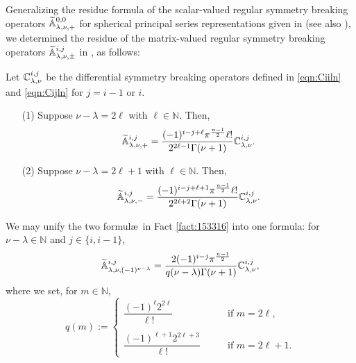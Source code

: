 Generalizing the residue formula
 of the scalar-valued regular symmetry breaking operators
 ${\widetilde{\mathbb{A}}}_{{\lambda},{\nu},{+}}^{{0,0}}$
 for spherical principal series representations
 given in \cite{xkEastwood} (see also \cite[Thm.~12.2]{sbon}), 
 we determined the residue
 of the matrix-valued regular symmetry breaking operators
 ${\widetilde{\mathbb{A}}}_{{\lambda},{\nu},{\pm}}^{{i,j}}$
 in \cite{xkresidue}, 
 as follows:
\begin{fact}
\label{fact:153316}
Let ${\mathbb{C}}_{{\lambda},{\nu}}^{{i,j}}$ be the differential symmetry breaking operators
 defined in \eqref{eqn:Ciiln}
 and \eqref{eqn:Cijln} for $j=i-1$ or $i$.  
\begin{enumerate}
\item[{\rm{(1)}}]
Suppose $\nu-\lambda=2\ell$ with $\ell \in {\mathbb{N}}$.  
Then, 
\begin{equation}
\label{eqn:Aijres1}
{\widetilde{\mathbb{A}}}_{{\lambda},{\nu},{+}}^{{i,j}} 
=
\frac{(-1)^{i-j+\ell} \pi^{\frac{n-1}{2}} \ell !}{2^{2\ell-1}\Gamma(\nu+1)}
{\mathbb{C}}_{{\lambda},{\nu}}^{{i,j}}.  
\end{equation}
\item[{\rm{(2)}}]
Suppose $\nu-\lambda=2\ell+1$ with $\ell \in {\mathbb{N}}$.  
Then, 
\[
{\widetilde{\mathbb{A}}}_{{\lambda},{\nu},{-}}^{{i,j}} 
=
\frac{(-1)^{i-j+\ell+1} \pi^{\frac{n-1}{2}} \ell !}{2^{2\ell+2}\Gamma(\nu+1)}
{\mathbb{C}}_{{\lambda},{\nu}}^{{i,j}}.  
\]
\end{enumerate}
\end{fact}



We may unify the two formul\ae\
 in Fact \ref{fact:153316}
 into one formula:
for $\nu -\lambda \in {\mathbb{N}}$ and $j \in \{i,i-1\}$, 
\begin{equation}
\label{eqn:qAC}
{\widetilde{\mathbb{A}}}_{{\lambda},{\nu},{(-1)^{\nu-\lambda}}}^{{i,j}}
=
\frac{2(-1)^{i-j} \pi^{\frac {n-1}2}}{q(\nu-\lambda)\Gamma(\nu+1)}
{\mathbb{C}}_{{\lambda},{\nu}}^{{i,j}}, 
\end{equation}
where we set,
 for $m \in {\mathbb{N}}$, 
\begin{equation}
\label{eqn:qm}
q(m):=
\begin{cases}
\dfrac{(-1)^{\ell} 2^{2\ell}}{\ell!}
\qquad
&\text{if $m=2\ell$}, 
\\
&
\\
\dfrac{(-1)^{\ell+1} 2^{2\ell+3}}{\ell!}
\qquad
&\text{if $m=2\ell+1$}.  
\end{cases}
\end{equation}


